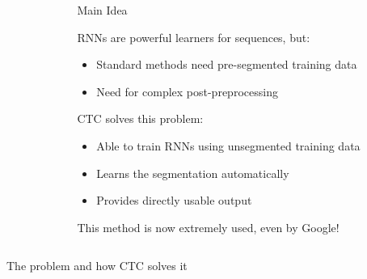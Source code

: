 \documentclass[final]{beamer}
\newlength{\onecolwid}
\newlength{\twocolwid}
\begin{document}
\begin{frame}[t]
\begin{columns}[t]
\begin{column}{\twocolwid}
\begin{columns}[t,totalwidth=\twocolwid]
\begin{column}{\onecolwid}
\end{column} %

\begin{column}{\onecolwid}\vspace{-.6in} %


\begin{block}{Main Idea}

RNNs are powerful learners for sequences, but:

\begin{itemize}
\item Standard methods need pre-segmented training data
\item Need for complex post-preprocessing
\end{itemize}

CTC solves this problem:

\begin{itemize}
\item Able to train RNNs using unsegmented training data
\item Learns the segmentation automatically
\item Provides directly usable output
\end{itemize}

This method is now extremely used, even by Google!

\end{block}



\end{column} %

\end{columns} %


\begin{alertblock}{The problem and how CTC solves it}


\end{alertblock}
\end{column}
\end{columns}
\end{frame}
\end{document}
